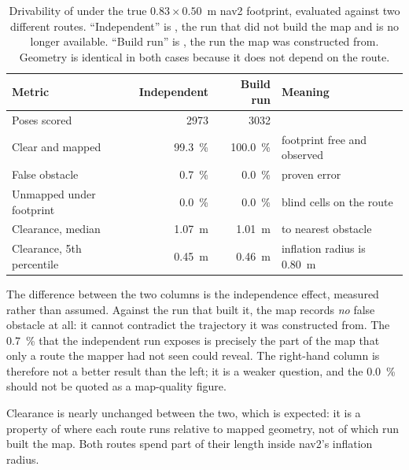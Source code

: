 \begin{table}[htbp]
\centering
\caption{Drivability of  under the true
$0.83\times0.50$~m nav2 footprint, evaluated against two different routes.
``Independent'' is , the run that did not build
the map and is no longer available. ``Build run'' is
, the run the map was constructed from. Geometry
is identical in both cases because it does not depend on the route.}
\label{tab:map-drivability}
\small
\setlength{\tabcolsep}{4pt}
\begin{tabularx}{\textwidth}{>{\raggedright\arraybackslash}p{}rr>{\raggedright\arraybackslash}X}
\toprule
Metric & Independent & Build run & Meaning \\
\midrule
Poses scored & \num{2973} & \num{3032} & \\
Clear and mapped & \SI{99.3}{\percent} & \SI{100.0}{\percent} & footprint free
  and observed \\
False obstacle & \SI{0.7}{\percent} & \SI{0.0}{\percent} & proven error \\
Unmapped under footprint & \SI{0.0}{\percent} & \SI{0.0}{\percent} & blind cells
  on the route \\
Clearance, median & \SI{1.07}{\metre} & \SI{1.01}{\metre} & to nearest obstacle \\
Clearance, 5th percentile & \SI{0.45}{\metre} & \SI{0.46}{\metre} & inflation
  radius is \SI{0.80}{\metre} \\
\bottomrule
\end{tabularx}
\end{table}

The difference between the two columns is the independence effect, measured rather
than assumed. Against the run that built it, the map records \emph{no} false
obstacle at all: it cannot contradict the trajectory it was constructed from. The
\SI{0.7}{\percent} that the independent run exposes is precisely the part of the
map that only a route the mapper had not seen could reveal. The right-hand column
is therefore not a better result than the left; it is a weaker question, and the
\SI{0.0}{\percent} should not be quoted as a map-quality figure.

Clearance is nearly unchanged between the two, which is expected: it is a property
of where each route runs relative to mapped geometry, not of which run built the
map. Both routes spend part of their length inside nav2's inflation radius.

